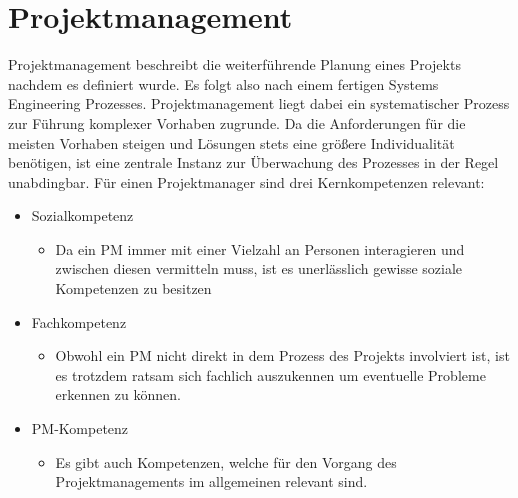 \documentclass{article}
\begin{document}
	\section{Projektmanagement}
	Projektmanagement beschreibt die weiterführende Planung eines Projekts nachdem es definiert wurde. Es folgt also nach einem fertigen Systems Engineering Prozesses. Projektmanagement liegt dabei ein systematischer Prozess zur Führung komplexer Vorhaben zugrunde. Da die Anforderungen für die meisten Vorhaben steigen und Lösungen stets eine größere Individualität benötigen, ist eine zentrale Instanz zur Überwachung des Prozesses in der Regel unabdingbar. Für einen Projektmanager sind drei Kernkompetenzen relevant:
	\begin{itemize}
		\item{Sozialkompetenz}
		\begin{itemize}
			\item{Da ein PM immer mit einer Vielzahl an Personen interagieren und zwischen diesen vermitteln muss, ist es unerlässlich gewisse soziale Kompetenzen zu besitzen}
		\end{itemize}
		\item{Fachkompetenz}
		\begin{itemize}
			\item{Obwohl ein PM nicht direkt in dem Prozess des Projekts involviert ist, ist es trotzdem ratsam sich fachlich auszukennen um eventuelle Probleme erkennen zu können.}
		\end{itemize}
		\item{PM-Kompetenz}
		\begin{itemize}
			\item{Es gibt auch Kompetenzen, welche für den Vorgang des Projektmanagements im allgemeinen relevant sind.}
		\end{itemize}
	\end{itemize}
\end{document}
